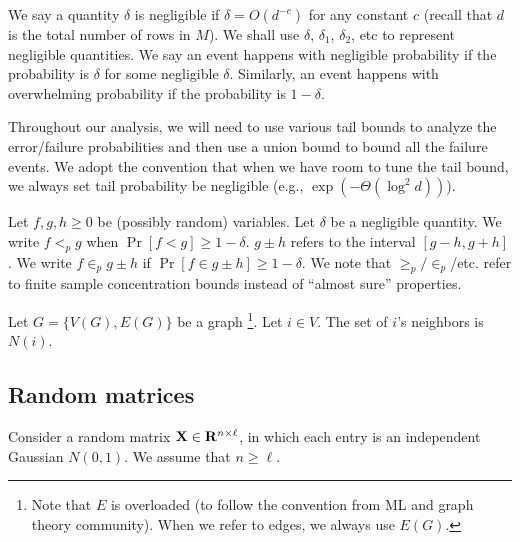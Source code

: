  We say a quantity $\delta$ is negligible if $\delta = O(d^{-c})$ for any constant $c$ (recall that $d$ is the total number of rows in $M$). We shall use $\delta$, $\delta_1$, $\delta_2$, etc to represent negligible quantities. 
We say an event happens with negligible probability if the probability is $\delta$ for some negligible $\delta$. Similarly, an event happens with overwhelming probability if the probability is $1 - \delta$. 
 
Throughout our analysis, we will need to use various tail bounds to analyze the error/failure probabilities and then use a union bound to bound all the failure events. We adopt the convention that when we have room to tune the tail bound, we always set tail probability be negligible (e.g., $\exp(-\Theta(\log^2d))$). 

 
Let $f, g, h \geq 0$ be (possibly random) variables. Let $\delta$ be a negligible quantity. We write $f <_p g$ when $\Pr[f < g] \geq 1 - \delta$. $g \pm h$ refers to the interval $[g - h, g + h ]$. We write $f \in_p g \pm h$ if $\Pr[f \in g\pm h] \geq 1 - \delta$. We note that $\geq_p/\in_p$/etc. refer to finite sample concentration bounds instead of ``almost sure'' properties. 

 Let $G = \{V(G), E(G)\}$ be a graph \footnote{Note that $E$ is overloaded (to follow the convention from ML and graph theory community). When we refer to edges, we always use $E(G)$.}. %
Let $i \in V$. The set of $i$'s neighbors is $N(i)$. 



\subsection{Random matrices}\label{sec:randommatrix}
Consider a random matrix $\mathbf{X} \in \mathbf{R}^{n \times \ell}$, in which each entry is an independent Gaussian $N(0, 1)$. We assume that $n \geq \ell$. 

